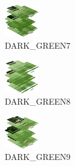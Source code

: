 \hspace{0.1cm}
\begin{minipage}[b]{0.15\linewidth}
\begin{figure}[H]                                                          
  \centering                                                             
  \begin{adjustbox}{width=1.5cm,center}                                   
  \includegraphics[width=1.5cm]{src/colorspace_colourflow/flows/colourflow_215-45.png}%
  \end{adjustbox}                                                        
\caption*{DARK\_GREEN7}                                           
\end{figure}                                                               
\end{minipage}
\hspace{0.1cm}
\begin{minipage}[b]{0.15\linewidth}
\begin{figure}[H]                                                          
  \centering                                                             
  \begin{adjustbox}{width=1.5cm,center}                                   
  \includegraphics[width=1.5cm]{src/colorspace_colourflow/flows/colourflow_216-45.png}%
  \end{adjustbox}                                                        
\caption*{DARK\_GREEN8}                                           
\end{figure}                                                               
\end{minipage}
\hspace{0.1cm}
\begin{minipage}[b]{0.15\linewidth}
\begin{figure}[H]                                                          
  \centering                                                             
  \begin{adjustbox}{width=1.5cm,center}                                   
  \includegraphics[width=1.5cm]{src/colorspace_colourflow/flows/colourflow_217-45.png}%
  \end{adjustbox}                                                        
\caption*{DARK\_GREEN9}                                           
\end{figure}                                                               
\end{minipage}

